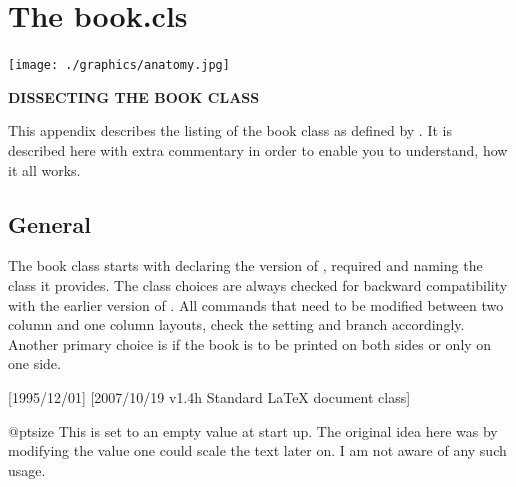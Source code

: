 \let\HUGE\Huge

\setlength\columnsep{2em}
\def\Paragraph#1{{\bfseries #1}\quad}
\let\sidenote\footnote
\chapter{The book.cls}
\label{ch:bookclass}


\clearpage

\texttt{[image: ./graphics/anatomy.jpg]}

\vspace{2\baselineskip}

\textbf{\Large DISSECTING THE BOOK CLASS}
\thispagestyle{plain}
\begin{multicols}{2}
This appendix describes the listing of the book class as defined by \latexe. It is described here with extra commentary in order to enable you to understand, how it all works.

\lipsum[1-3]
\end{multicols}

\section{General}
\pagestyle{headings}

The book class starts with declaring the version of \latex, required
and naming the class it provides. The class choices are always checked for backward compatibility with the earlier version of \latex. All commands that need to be modified between two column and one column layouts, check the setting and branch accordingly. Another primary choice is if the book is to be printed on both sides or only on one side.


\begin{teX}
[1995/12/01]
              [2007/10/19 v1.4h
 Standard LaTeX document class]
\end{teX}

\begin{docCommand}{@ptsize} { }
This is set to an empty value at start up. The original idea here was by modifying the value one could scale the
text later on. I am not aware of any such usage.
\end{docCommand}


